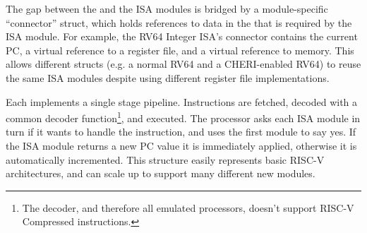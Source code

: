 The gap between the  and the ISA modules is bridged by a module-specific ``connector'' struct, which holds references to data in the  that is required by the ISA module.
For example, the RV64 Integer ISA's connector contains the current PC, a virtual reference to a register file, and a virtual reference to memory.
This allows different  structs (e.g. a normal RV64 and a CHERI-enabled RV64) to reuse the same ISA modules despite using different register file implementations.

Each  implements a single stage pipeline.
Instructions are fetched, decoded with a common decoder function\footnote{The decoder, and therefore all emulated processors, doesn't support RISC-V Compressed instructions.}, and executed.
The processor asks each ISA module in turn if it wants to handle the instruction, and uses the first module to say yes.
If the ISA module returns a new PC value it is immediately applied, otherwise it is automatically incremented.
This structure easily represents basic RISC-V architectures, and can scale up to support many different new modules.







